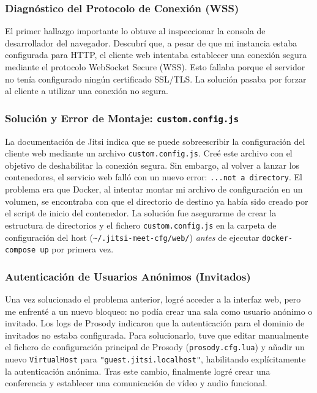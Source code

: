 \subsubsection{Diagnóstico del Protocolo de Conexión (WSS)}
El primer hallazgo importante lo obtuve al inspeccionar la consola de desarrollador del navegador. Descubrí que, a pesar de que mi instancia estaba configurada para HTTP, el cliente web intentaba establecer una conexión segura mediante el protocolo WebSocket Secure (WSS). Esto fallaba porque el servidor no tenía configurado ningún certificado SSL/TLS. La solución pasaba por forzar al cliente a utilizar una conexión no segura.

\subsubsection{Solución y Error de Montaje: \texttt{custom.config.js}}
La documentación de Jitsi indica que se puede sobreescribir la configuración del cliente web mediante un archivo \texttt{custom.config.js}. Creé este archivo con el objetivo de deshabilitar la conexión segura. Sin embargo, al volver a lanzar los contenedores, el servicio web falló con un nuevo error: \texttt{...not a directory}. El problema era que Docker, al intentar montar mi archivo de configuración en un volumen, se encontraba con que el directorio de destino ya había sido creado por el script de inicio del contenedor. La solución fue asegurarme de crear la estructura de directorios y el fichero \texttt{custom.config.js} en la carpeta de configuración del host (\texttt{\textasciitilde{}/.jitsi-meet-cfg/web/}) \textit{antes} de ejecutar \texttt{docker-compose up} por primera vez.

\subsubsection{Autenticación de Usuarios Anónimos (Invitados)}
Una vez solucionado el problema anterior, logré acceder a la interfaz web, pero me enfrenté a un nuevo bloqueo: no podía crear una sala como usuario anónimo o invitado. Los logs de Prosody indicaron que la autenticación para el dominio de invitados no estaba configurada. Para solucionarlo, tuve que editar manualmente el fichero de configuración principal de Prosody (\texttt{prosody.cfg.lua}) y añadir un nuevo \texttt{VirtualHost} para \texttt{"guest.jitsi.localhost"}, habilitando explícitamente la autenticación anónima. Tras este cambio, finalmente logré crear una conferencia y establecer una comunicación de vídeo y audio funcional.

